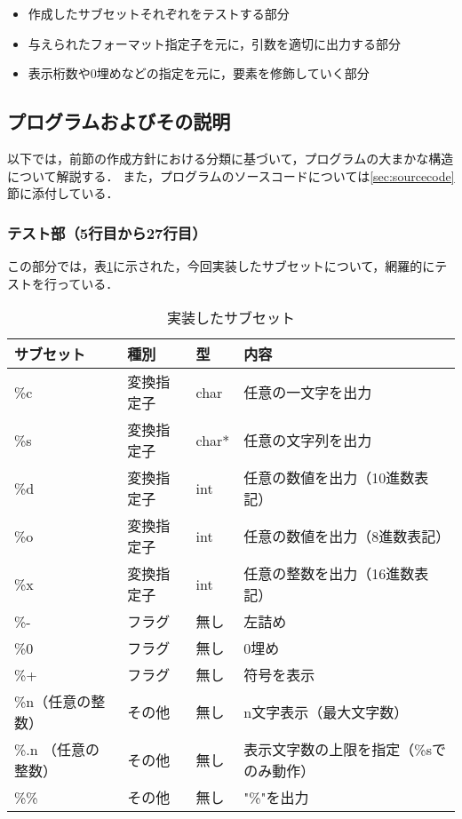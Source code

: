 \documentclass[a4j,11pt]{jarticle}
\begin{document}
\begin{itemize}
      \item 作成したサブセットそれぞれをテストする部分
      \item 与えられたフォーマット指定子を元に，引数を適切に出力する部分
      \item 表示桁数や0埋めなどの指定を元に，要素を修飾していく部分
\end{itemize}

\subsection{プログラムおよびその説明}

以下では，前節の作成方針における分類に基づいて，プログラムの大まかな構造について解説する．
また，プログラムのソースコードについては\ref{sec:sourcecode}節に添付している．

\subsubsection{テスト部（5行目から27行目）}
この部分では，表\ref{tbl:2-5}に示された，今回実装したサブセットについて，網羅的にテストを行っている．

\begin{table}[]
      \centering
      \caption{実装したサブセット}
      \label{tbl:2-5}
      \begin{tabular}{|l|l|l|l|}
            \hline
            サブセット & 種別 & 型 & 内容                  \\ \hline
            \%c   & 変換指定子 & char  & 任意の一文字を出力           \\ \hline
            \%s   & 変換指定子 & char* & 任意の文字列を出力           \\ \hline
            \%d   & 変換指定子 & int   & 任意の数値を出力（10進数表記）    \\ \hline
            \%o   & 変換指定子 & int   & 任意の数値を出力（8進数表記）     \\ \hline
            \%x   & 変換指定子 & int   & 任意の整数を出力（16進数表記）    \\ \hline
            \%-  & フラグ & 無し    & 左詰め           \\ \hline
            \%0  & フラグ & 無し    & 0埋め             \\ \hline
            \%+  & フラグ & 無し    & 符号を表示         \\ \hline
            \%n（任意の整数）  & その他 & 無し    & n文字表示（最大文字数）   \\ \hline
            \%.n （任意の整数） & その他 & 無し    & 表示文字数の上限を指定（\%sでのみ動作）   \\ \hline
            \%\%  & その他 & 無し    & "\%"を出力             \\ \hline
      \end{tabular}
\end{table}
\end{document}
